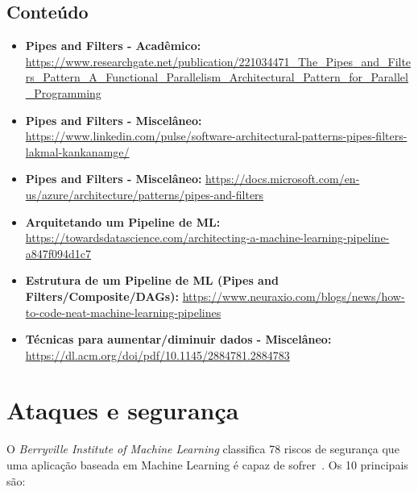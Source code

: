 \documentclass[portugues, 12pt, a4paper]{article}
\begin{document}
\subsection{Conteúdo}

\begin{itemize}
\item \textbf{Pipes and Filters - Acadêmico:} \url{https://www.researchgate.net/publication/221034471_The_Pipes_and_Filters_Pattern_A_Functional_Parallelism_Architectural_Pattern_for_Parallel_Programming}

\item \textbf{Pipes and Filters - Miscelâneo:} \url{https://www.linkedin.com/pulse/software-architectural-patterns-pipes-filters-lakmal-kankanamge/}

\item \textbf{Pipes and Filters - Miscelâneo:} \url{https://docs.microsoft.com/en-us/azure/architecture/patterns/pipes-and-filters}

\item \textbf{Arquitetando um Pipeline de ML:} \url{https://towardsdatascience.com/architecting-a-machine-learning-pipeline-a847f094d1c7}

\item \textbf{Estrutura de um Pipeline de ML (Pipes and Filters/Composite/DAGs):} \url{https://www.neuraxio.com/blogs/news/how-to-code-neat-machine-learning-pipelines}

\item \textbf{Técnicas para aumentar/diminuir dados - Miscelâneo:} \url{https://dl.acm.org/doi/pdf/10.1145/2884781.2884783}

\end{itemize}

\section{Ataques e segurança}

O \textit{Berryville Institute of Machine Learning} classifica 78 riscos de segurança que uma aplicação baseada em Machine Learning é capaz de sofrer~\citep{McGraw_2020}. Os 10 principais são:
\end{document}
